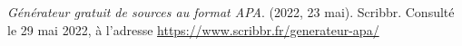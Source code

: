 \documentclass[a4paper, 12pt, twosides]{book}
\makeatletter
\renewcommand\frontmatter{
    \cleardoublepage
    \pagestyle{frontmatter}
    \@mainmatterfalse
}
\renewcommand\mainmatter{
    \cleardoublepage
    \pagestyle{body}
    \@mainmattertrue
}
\makeatother
\begin{document}


\let\cleardoublepage\clearpage





\frontmatter





% 


\tableofcontents {} \newpage





% 





\mainmatter





% 


% 


% 





\appendix










% 





\begin{thebibliography}{9} 
     \textit{Générateur gratuit de sources au format APA}. (2022, 23 mai). Scribbr. Consulté le 29 mai 2022, à l’adresse \url{https://www.scribbr.fr/generateur-apa/}
\end{thebibliography}
\end{document}
